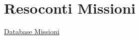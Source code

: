\section{Resoconti Missioni}\label{resoconti-missioni}

\href{Database\%20Missioni\%20268e3bb9fb744924b0bab86709a73288.csv}{Database
Missioni}
